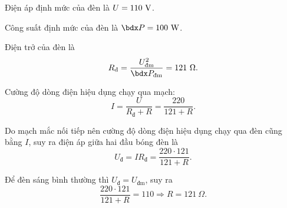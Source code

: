 \begin{enumerate}[label=\bfseries Câu \arabic*:]
{		Điện áp định mức của đèn là $U=110\ \text V$.
		
		Công suất định mức của đèn là $\calP = 100\ \text W$.
		
		Điện trở của đèn là
		$$R_\text{đ}=\dfrac{U_\text{đm}^2}{\calP_\text{đm}} = 121\ \Omega.$$
		
		
		Cường độ dòng điện hiệu dụng chạy qua mạch:
		$$I=\dfrac{U}{R_\text{đ} + R} = \dfrac{220}{121+R}.$$
		
		
		Do mạch mắc nối tiếp nên cường độ dòng điện hiệu dụng chạy qua đèn cũng bằng $I$, suy ra điện áp giữa hai đầu bóng đèn là
		$$U_\text{đ} = IR_\text{đ} = \dfrac{220\cdot121}{121+R}.$$
		
		
		Để đèn sáng bình thường thì $U_\text{đ}=U_\text{đm}$, suy ra
		$$	\dfrac{220\cdot121}{121+R} = 110 \Rightarrow R = 121\ \Omega.$$
		
	}
\end{enumerate}
